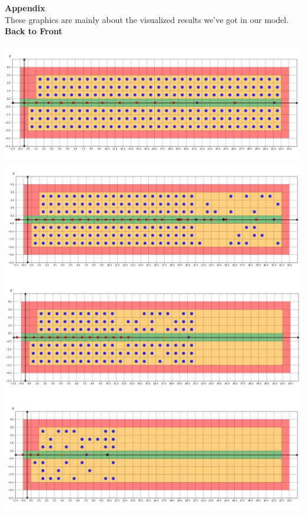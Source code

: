 \documentclass{article}
\begin{document}
	\newpage
	\cleardoublepage
	\thispagestyle{empty}
	\renewcommand\refname{Appendix}
	\Huge \textbf{Appendix}
	\\[0.8cm]
	\normalsize These graphics are mainly about the visualized results we've got in our model.
	\\[2pt]
	\large \textbf{Back to Front}
	\begin{center}
		\includegraphics[width=14cm]{backtofront1.jpg}\\
		\includegraphics[width=14cm]{backtofront2.jpg}\\
		\includegraphics[width=14cm]{backtofront3.jpg}\\
		\clearpage
		\thispagestyle{empty}
		\includegraphics[width=14cm]{backtofront4.jpg}\\
	\end{center}
\end{document}
